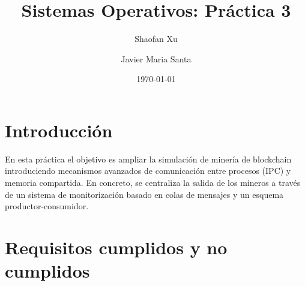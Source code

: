 \documentclass[12pt,a4paper]{article}
\title{\textbf{Sistemas Operativos: Práctica 3}}
\author{
    Shaofan Xu \\
    \and 
    Javier Maria Santa
    }
\date{\today}
\begin{document}
\maketitle
\newpage

\tableofcontents
\newpage

\clearpage
\section{Introducción}
En esta práctica el objetivo es ampliar la simulación de minería de blockchain introduciendo mecanismos avanzados de comunicación entre procesos (IPC) y memoria compartida. En concreto, se centraliza la salida de los mineros a través de un sistema de monitorización basado en colas de mensajes y un esquema productor-consumidor.

\section{Requisitos cumplidos y no cumplidos}
\end{document}
